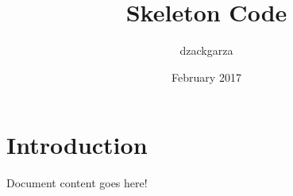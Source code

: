 \documentclass{article}
\title{Skeleton Code}
\author{dzackgarza }
\date{February 2017}
\begin{document}
\maketitle

\section{Introduction}

Document content goes here!
\end{document}
